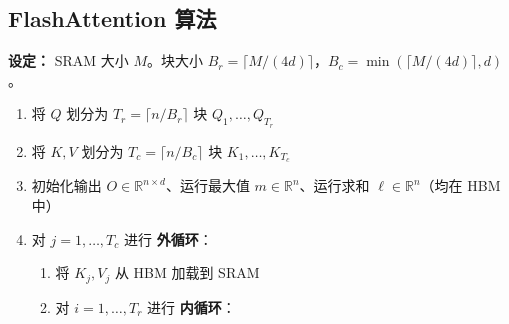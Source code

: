 \subsection{FlashAttention 算法}
\label{the-flash-attention-algorithm}

\begin{examplebox}
\textbf{设定：} SRAM 大小 $M$。块大小 $B_r = \lceil M / (4d) \rceil$，$B_c = \min(\lceil M / (4d) \rceil, d)$。

\begin{enumerate}
  \item 将 $Q$ 划分为 $T_r = \lceil n / B_r \rceil$ 块 $Q_1, \ldots, Q_{T_r}$
  \item 将 $K, V$ 划分为 $T_c = \lceil n / B_c \rceil$ 块 $K_1, \ldots, K_{T_c}$
  \item 初始化输出 $O \in \mathbb{R}^{n \times d}$、运行最大值 $m \in \mathbb{R}^n$、运行求和 $\ell \in \mathbb{R}^n$（均在 HBM 中）
  \item 对 $j = 1, \ldots, T_c$ 进行 \textbf{外循环}：

\begin{enumerate}
  \item 将 $K_j, V_j$ 从 HBM 加载到 SRAM
  \item 对 $i = 1, \ldots, T_r$ 进行 \textbf{内循环}：


\end{enumerate}
\end{enumerate}
\end{examplebox}

